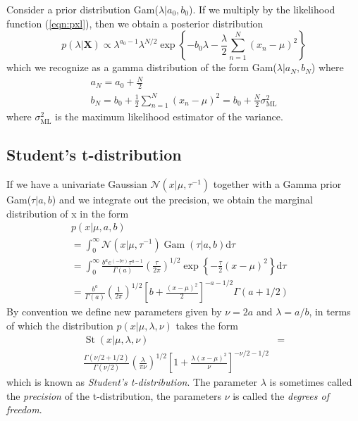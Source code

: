 \documentclass[5p,sort&compress]{elsarticle}
\begin{document}
Consider a prior distribution Gam($\lambda|a_0, b_0$). If we multiply by the likelihood function (\ref{eqn:pxl}), then we obtain a posterior distribution
\begin{equation}
p(\lambda | \mathbf{X}) \propto \lambda^{a_{0}-1} \lambda^{N / 2} \exp \left\{-b_{0} \lambda-\frac{\lambda}{2} \sum_{n=1}^{N}\left(x_{n}-\mu\right)^{2}\right\}
\end{equation}
which we recognize as a gamma distribution of the form Gam($\lambda|a_N, b_N$) where
\begin{equation}
\begin{aligned}{a_{N}=a_{0}+\frac{N}{2}} \\ {b_{N}=b_{0}+\frac{1}{2} \sum_{n=1}^{N}\left(x_{n}-\mu\right)^{2}=b_{0}+\frac{N}{2} \sigma_{\mathrm{ML}}^{2}}\end{aligned}
\end{equation}
where $\sigma_{\mathrm{ML}}^2$ is the maximum likelihood estimator of the variance.


\subsection{Student's t-distribution}

If we have a univariate Gaussian $\mathcal{N}(x|\mu, \tau^{-1})$ together with a Gamma prior Gam($\tau | a, b$) and we integrate out the precision, we obtain the marginal distribution of x in the form 
\begin{equation}\label{eqn:t-distribution}
\begin{aligned} p(x | \mu, a, b) & \\ =\int_{0}^{\infty} \mathcal{N}\left(x | \mu, \tau^{-1}\right) \operatorname{Gam}(\tau | a, b) \mathrm{d} \tau & \\ = \int_{0}^{\infty} \frac{b^{a} e^{(-b \tau)} \tau^{a-1}}{\Gamma(a)}\left(\frac{\tau}{2 \pi}\right)^{1 / 2} \exp \left\{-\frac{\tau}{2}(x-\mu)^{2}\right\} \mathrm{d} \tau  & \\ =  \frac{b^{a}}{\Gamma(a)}\left(\frac{1}{2 \pi}\right)^{1 / 2}\left[b+\frac{(x-\mu)^{2}}{2}\right]^{-a-1 / 2} \Gamma(a+1 / 2) \end{aligned}
\end{equation}
By convention we define new parameters given by $\nu=2a$ and $\lambda=a/b$, in terms of which the distribution $p(x|\mu,\lambda,\nu)$ takes the form
\begin{equation}
\begin{aligned}
\operatorname{St}(x | \mu, \lambda, \nu) & = \\ \frac{\Gamma(\nu / 2+1 / 2)}{\Gamma(\nu / 2)}\left(\frac{\lambda}{\pi \nu}\right)^{1 / 2}\left[1+\frac{\lambda(x-\mu)^{2}}{\nu}\right]^{-\nu / 2-1 / 2}
\end{aligned}
\end{equation}
which is known as \textit{Student's t-distribution}. The parameter $\lambda$ is sometimes called the \textit{precision} of the t-distribution, the parameters $\nu$ is called the \textit{degrees of freedom}.
\end{document}
